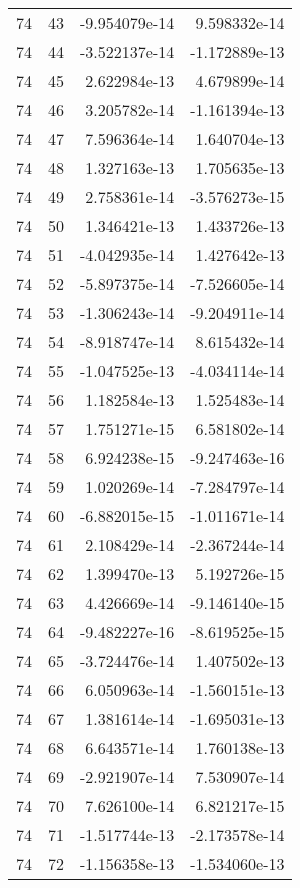 \begin{tabular}{rrrr}
  74 &   43 & -9.954079e-14 &  9.598332e-14 \\
  74 &   44 & -3.522137e-14 & -1.172889e-13 \\
  74 &   45 &  2.622984e-13 &  4.679899e-14 \\
  74 &   46 &  3.205782e-14 & -1.161394e-13 \\
  74 &   47 &  7.596364e-14 &  1.640704e-13 \\
  74 &   48 &  1.327163e-13 &  1.705635e-13 \\
  74 &   49 &  2.758361e-14 & -3.576273e-15 \\
  74 &   50 &  1.346421e-13 &  1.433726e-13 \\
  74 &   51 & -4.042935e-14 &  1.427642e-13 \\
  74 &   52 & -5.897375e-14 & -7.526605e-14 \\
  74 &   53 & -1.306243e-14 & -9.204911e-14 \\
  74 &   54 & -8.918747e-14 &  8.615432e-14 \\
  74 &   55 & -1.047525e-13 & -4.034114e-14 \\
  74 &   56 &  1.182584e-13 &  1.525483e-14 \\
  74 &   57 &  1.751271e-15 &  6.581802e-14 \\
  74 &   58 &  6.924238e-15 & -9.247463e-16 \\
  74 &   59 &  1.020269e-14 & -7.284797e-14 \\
  74 &   60 & -6.882015e-15 & -1.011671e-14 \\
  74 &   61 &  2.108429e-14 & -2.367244e-14 \\
  74 &   62 &  1.399470e-13 &  5.192726e-15 \\
  74 &   63 &  4.426669e-14 & -9.146140e-15 \\
  74 &   64 & -9.482227e-16 & -8.619525e-15 \\
  74 &   65 & -3.724476e-14 &  1.407502e-13 \\
  74 &   66 &  6.050963e-14 & -1.560151e-13 \\
  74 &   67 &  1.381614e-14 & -1.695031e-13 \\
  74 &   68 &  6.643571e-14 &  1.760138e-13 \\
  74 &   69 & -2.921907e-14 &  7.530907e-14 \\
  74 &   70 &  7.626100e-14 &  6.821217e-15 \\
  74 &   71 & -1.517744e-13 & -2.173578e-14 \\
  74 &   72 & -1.156358e-13 & -1.534060e-13 \\

\end{tabular}
